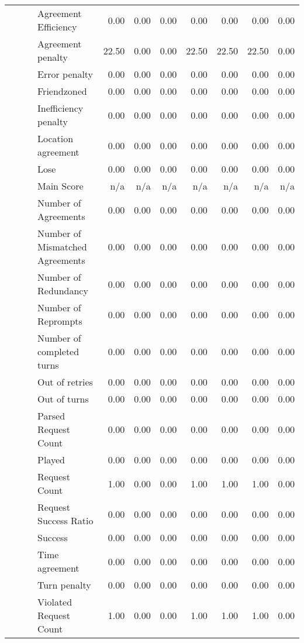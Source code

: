 \begin{tabular}{llllrrrrrrr}
 &  &  & Agreement Efficiency & 0.00 & 0.00 & 0.00 & 0.00 & 0.00 & 0.00 & 0.00 \\
 &  &  & Agreement penalty & 22.50 & 0.00 & 0.00 & 22.50 & 22.50 & 22.50 & 0.00 \\
 &  &  & Error penalty & 0.00 & 0.00 & 0.00 & 0.00 & 0.00 & 0.00 & 0.00 \\
 &  &  & Friendzoned & 0.00 & 0.00 & 0.00 & 0.00 & 0.00 & 0.00 & 0.00 \\
 &  &  & Inefficiency penalty & 0.00 & 0.00 & 0.00 & 0.00 & 0.00 & 0.00 & 0.00 \\
 &  &  & Location agreement & 0.00 & 0.00 & 0.00 & 0.00 & 0.00 & 0.00 & 0.00 \\
 &  &  & Lose & 0.00 & 0.00 & 0.00 & 0.00 & 0.00 & 0.00 & 0.00 \\
 &  &  & Main Score & n/a & n/a & n/a & n/a & n/a & n/a & n/a \\
 &  &  & Number of Agreements & 0.00 & 0.00 & 0.00 & 0.00 & 0.00 & 0.00 & 0.00 \\
 &  &  & Number of Mismatched Agreements & 0.00 & 0.00 & 0.00 & 0.00 & 0.00 & 0.00 & 0.00 \\
 &  &  & Number of Redundancy & 0.00 & 0.00 & 0.00 & 0.00 & 0.00 & 0.00 & 0.00 \\
 &  &  & Number of Reprompts & 0.00 & 0.00 & 0.00 & 0.00 & 0.00 & 0.00 & 0.00 \\
 &  &  & Number of completed turns & 0.00 & 0.00 & 0.00 & 0.00 & 0.00 & 0.00 & 0.00 \\
 &  &  & Out of retries & 0.00 & 0.00 & 0.00 & 0.00 & 0.00 & 0.00 & 0.00 \\
 &  &  & Out of turns & 0.00 & 0.00 & 0.00 & 0.00 & 0.00 & 0.00 & 0.00 \\
 &  &  & Parsed Request Count & 0.00 & 0.00 & 0.00 & 0.00 & 0.00 & 0.00 & 0.00 \\
 &  &  & Played & 0.00 & 0.00 & 0.00 & 0.00 & 0.00 & 0.00 & 0.00 \\
 &  &  & Request Count & 1.00 & 0.00 & 0.00 & 1.00 & 1.00 & 1.00 & 0.00 \\
 &  &  & Request Success Ratio & 0.00 & 0.00 & 0.00 & 0.00 & 0.00 & 0.00 & 0.00 \\
 &  &  & Success & 0.00 & 0.00 & 0.00 & 0.00 & 0.00 & 0.00 & 0.00 \\
 &  &  & Time agreement & 0.00 & 0.00 & 0.00 & 0.00 & 0.00 & 0.00 & 0.00 \\
 &  &  & Turn penalty & 0.00 & 0.00 & 0.00 & 0.00 & 0.00 & 0.00 & 0.00 \\
 &  &  & Violated Request Count & 1.00 & 0.00 & 0.00 & 1.00 & 1.00 & 1.00 & 0.00 \\

\end{tabular}

